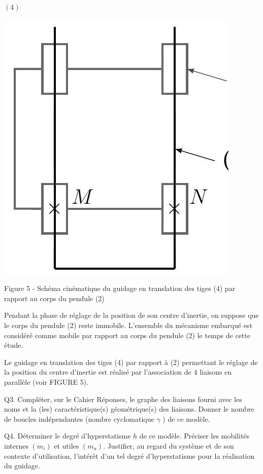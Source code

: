 \documentclass[10pt]{article}
\begin{document}
$(4)$

\begin{center}
\includegraphics[max width=\textwidth]{2024_04_26_3285cfc264024262add0g-05}
\end{center}

Figure 5 - Schéma cinématique du guidage en translation des tiges (4) par rapport au corps du pendule (2)

Pendant la phase de réglage de la position de son centre d'inertie, on suppose que le corps du pendule (2) reste immobile. L'ensemble du mécanisme embarqué est considéré comme mobile par rapport au corps du pendule (2) le temps de cette étude.

Le guidage en translation des tiges (4) par rapport à (2) permettant le réglage de la position du centre d'inertie est réalisé par l'association de 4 liaisons en parallèle (voir FIGURE 5).

Q3. Compléter, sur le Cahier Réponses, le graphe des liaisons fourni avec les noms et la (les) caractéristique(s) géométrique(s) des liaisons. Donner le nombre de boucles indépendantes (nombre cyclomatique $\gamma$ ) de ce modèle.

Q4. Déterminer le degré d'hyperstatisme $h$ de ce modèle. Préciser les mobilités internes $\left(m_{i}\right)$ et utiles $\left(m_{u}\right)$. Justifier, au regard du système et de son contexte d'utilisation, l'intérêt d'un tel degré d'hyperstatisme pour la réalisation du guidage.
\end{document}
